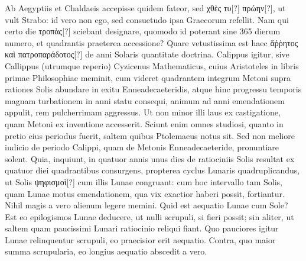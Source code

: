 Ab Aegyptiis
et Chaldaeis accepisse quidem fateor, sed \textgreek{χθὲς τυ[?] πρώην[?]},
 ut vult
Strabo: id vero non ego, sed consuetudo ipsa Graecorum refellit.
Nam
qui certo die \textgreek{τροπὰς[?]} sciebant designare,
 quomodo id poterant sine 365
dierum numero, et quadrantis praeterea accessione?
Quare vetustissima
est haec \textgreek{ἄῤῥητος καὶ πατροπαράδοτος[?]} de anni Solaris
 quantitate doctrina.
Calippus igitur, sive Callippus (utrumque reperio)
 Cyzicenus Mathematicus,
cuius Aristoteles in libris primae Philosophiae meminit,
cum videret quadrantem integrum Metoni supra rationes Solis
abundare in exitu Enneadecaeteridis, atque hinc progressu temporis
magnam turbationem in anni statu consequi, animum ad anni emendationem
appulit, rem pulcherrimam aggressus.
Ut non minor illi
laus ex castigatione, quam Metoni ex inventione accesserit.
Sciunt enim
omnes studiosi, quanto in pretio eius periodus fuerit, saltem quibus
Ptolemaeus notus sit.
Sed non meliore iudicio de periodo Calippi,
quam de Metonis Enneadecaeteride, pronuntiare solent.
Quia, inquiunt,
in quatuor annis unus dies de ratiociniis Solis resultat ex quatuor
diei quadrantibus consurgens, propterea cyclus Lunaris quadruplicandus,
ut Solis \textgreek{ψηφισμοὶ[?]} cum illis Lunae congruant: cum hoc
intervallo tam Solis, quam Lunae motus emendationem, qua vix exactior
haberi possit, fortiantur.
Nihil magis a vero alienum legere
memini.
Quid est aequatio Lunae cum Sole?
Est eo epilogismos Lunae
deducere, ut nulli scrupuli, si fieri possit; sin aliter, ut saltem quam
paucissimi Lunari ratiocinio reliqui fiant.
Quo pauciores igitur
Lunae relinquentur scrupuli, eo praecisior erit aequatio.
Contra, quo
maior summa scrupularia, eo longius aequatio abscedit a vero.
